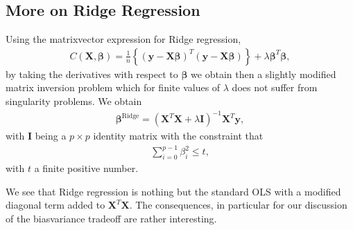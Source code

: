 \documentclass[letterpaper,10pt,english]{sphinxmanual}
\begin{document}
\subsection{More on Ridge Regression}
\label{\detokenize{chapter4:more-on-ridge-regression}}
Using the matrix\sphinxhyphen{}vector expression for Ridge regression,
\begin{equation*}
\begin{split}
C(\boldsymbol{X},\boldsymbol{\beta})=\frac{1}{n}\left\{(\boldsymbol{y}-\boldsymbol{X}\boldsymbol{\beta})^T(\boldsymbol{y}-\boldsymbol{X}\boldsymbol{\beta})\right\}+\lambda\boldsymbol{\beta}^T\boldsymbol{\beta},
\end{split}
\end{equation*}
by taking the derivatives with respect to \(\boldsymbol{\beta}\) we obtain then
a slightly modified matrix inversion problem which for finite values
of \(\lambda\) does not suffer from singularity problems. We obtain
\begin{equation*}
\begin{split}
\boldsymbol{\beta}^{\mathrm{Ridge}} = \left(\boldsymbol{X}^T\boldsymbol{X}+\lambda\boldsymbol{I}\right)^{-1}\boldsymbol{X}^T\boldsymbol{y},
\end{split}
\end{equation*}
with \(\boldsymbol{I}\) being a \(p\times p\) identity matrix with the constraint that
\begin{equation*}
\begin{split}
\sum_{i=0}^{p-1} \beta_i^2 \leq t,
\end{split}
\end{equation*}
with \(t\) a finite positive number.

We see that Ridge regression is nothing but the standard
OLS with a modified diagonal term added to \(\boldsymbol{X}^T\boldsymbol{X}\). The
consequences, in particular for our discussion of the bias\sphinxhyphen{}variance tradeoff
are rather interesting.
\end{document}

